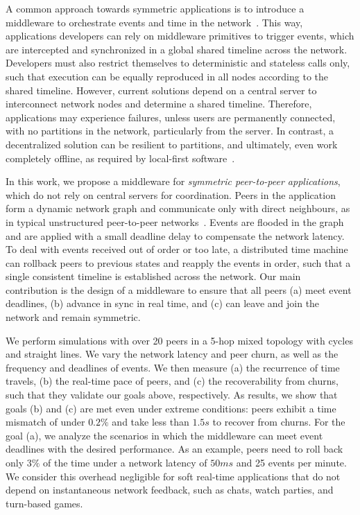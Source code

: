 \documentclass[10pt,journal,compsoc]{IEEEtran}
\begin{document}
A common approach towards symmetric applications is to introduce a middleware
to orchestrate events and time in the network~\cite{gals,croquet}.
This way, applications developers can rely on middleware primitives to trigger
events, which are intercepted and synchronized in a global shared timeline
across the network.
Developers must also restrict themselves to deterministic and stateless calls
only, such that execution can be equally reproduced in all nodes according to
the shared timeline. %
However, current solutions depend on a central server to interconnect network
nodes and determine a shared timeline.
Therefore, applications may experience failures, unless users are permanently
connected, with no partitions in the network, particularly from the server.
In contrast, a decentralized solution can be resilient to partitions, and
ultimately, even work completely offline, as required by local-first
software~\cite{local}.

In this work, we propose a middleware for \emph{symmetric peer-to-peer
applications}, which do not rely on central servers for coordination.
Peers in the application form a dynamic network graph and communicate only
with direct neighbours, as in typical unstructured peer-to-peer
networks~\cite{p2p.survey}.
Events are flooded in the graph and are applied with a small deadline delay to
compensate the network latency.
To deal with events received out of order or too late, a distributed time
machine can rollback peers to previous states and reapply the events in order,
such that a single consistent timeline is established across the network.
Our main contribution is the design of a middleware to ensure that all peers
    (a) meet event deadlines,
    (b) advance in sync in real time, and
    (c) can leave and join the network and remain symmetric.

We perform simulations with over 20 peers in a 5-hop mixed topology with cycles
and straight lines.
We vary the network latency and peer churn, as well as the frequency and
deadlines of events.
%
We then measure (a) the recurrence of time travels, (b) the real-time pace of
peers, and (c) the recoverability from churns, such that they validate our
goals above, respectively.
%
As results, we show that goals (b) and (c) are met even under extreme
conditions: peers exhibit a time mismatch of under $0.2\%$ and take less than
$1.5s$ to recover from churns.
%
For the goal (a), we analyze the scenarios in which the middleware can meet
event deadlines with the desired performance.
As an example, peers need to roll back only $3\%$ of the time under a network
latency of $50ms$ and 25 events per minute.
%
We consider this overhead negligible for soft real-time applications that do
not depend on instantaneous network feedback, such as chats, watch parties, and
turn-based games.
\end{document}
